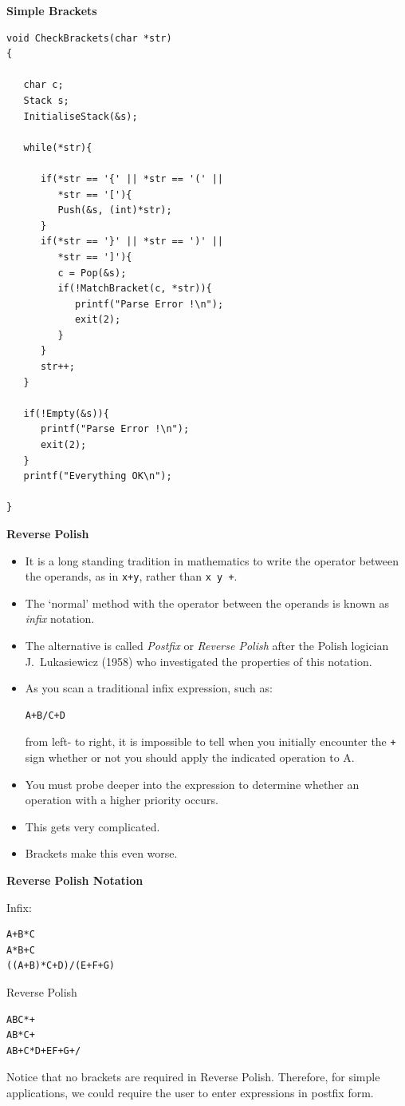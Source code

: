 \documentclass[a4,portraitt]{slides}
\begin{document}
\newpage
{\samepage
\begin{center}
{\Large{\bf Simple Brackets}}
\end{center}
{\small
\begin{verbatim}
void CheckBrackets(char *str)
{

   char c;
   Stack s;
   InitialiseStack(&s);

   while(*str){

      if(*str == '{' || *str == '(' ||
         *str == '['){
         Push(&s, (int)*str);
      }
      if(*str == '}' || *str == ')' ||
         *str == ']'){
         c = Pop(&s);
         if(!MatchBracket(c, *str)){
            printf("Parse Error !\n");
            exit(2);
         }
      }
      str++;
   }

   if(!Empty(&s)){
      printf("Parse Error !\n");
      exit(2);
   }
   printf("Everything OK\n");

}
\end{verbatim}
}}

\newpage
{\samepage
\begin{center}
{\Large{\bf Reverse Polish}}
\end{center}
{\small
\begin{itemize}
\item It is a long standing tradition in mathematics to write the operator
between the operands, as in \verb^x+y^, rather than \verb^x y +^.
\item The `normal' method with the operator between the operands is
known as {\it infix} notation.
\item The alternative is called {\it Postfix} or {\it Reverse Polish}
after the Polish logician J.\ Lukasiewicz (1958) who investigated the
properties of this notation.
\item As you scan a traditional infix expression, such as:
\begin{verbatim}
A+B/C+D
\end{verbatim}
from left- to right, it is impossible to tell when you initially encounter the \verb^+^ sign whether or not you should apply the indicated operation to
A.
\item You must probe deeper into the expression to determine whether an operation with a higher priority occurs.
\item This gets very complicated.
\item Brackets make this even worse.
\end{itemize}
}}

\newpage
{\samepage
\begin{center}
{\Large{\bf Reverse Polish Notation}}
\end{center}

Infix:
\begin{verbatim}
A+B*C
A*B+C
((A+B)*C+D)/(E+F+G)
\end{verbatim}

Reverse Polish
\begin{verbatim}
ABC*+
AB*C+
AB+C*D+EF+G+/
\end{verbatim}

Notice that no brackets are required in Reverse Polish. Therefore,
for simple applications, we could require the user to enter expressions
in postfix form.
}
\end{document}
